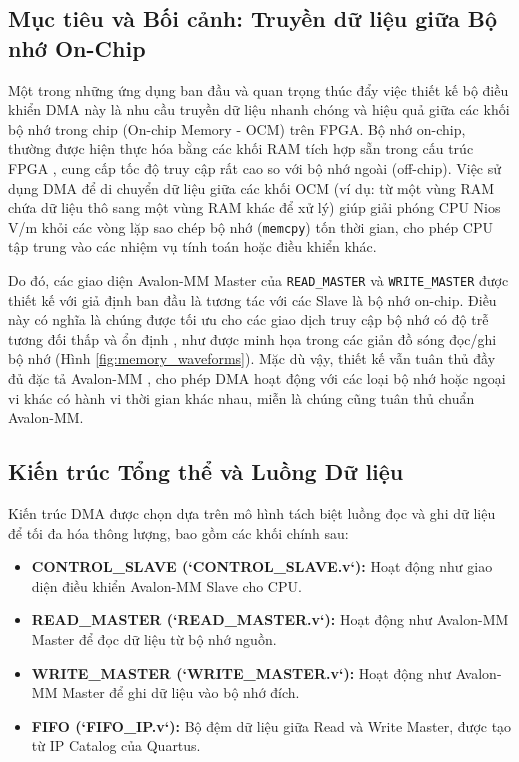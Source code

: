 \subsection{Mục tiêu và Bối cảnh: Truyền dữ liệu giữa Bộ nhớ On-Chip}
\label{subsec:dma_context_onchip}
Một trong những ứng dụng ban đầu và quan trọng thúc đẩy việc thiết kế bộ điều khiển DMA này là nhu cầu truyền dữ liệu nhanh chóng và hiệu quả giữa các khối bộ nhớ trong chip (On-chip Memory - OCM) trên FPGA. Bộ nhớ on-chip, thường được hiện thực hóa bằng các khối RAM tích hợp sẵn trong cấu trúc FPGA \cite{memory_byteenable}, cung cấp tốc độ truy cập rất cao so với bộ nhớ ngoài (off-chip). Việc sử dụng DMA để di chuyển dữ liệu giữa các khối OCM (ví dụ: từ một vùng RAM chứa dữ liệu thô sang một vùng RAM khác để xử lý) giúp giải phóng CPU Nios V/m khỏi các vòng lặp sao chép bộ nhớ (\texttt{memcpy}) tốn thời gian, cho phép CPU tập trung vào các nhiệm vụ tính toán hoặc điều khiển khác.

Do đó, các giao diện Avalon-MM Master của \texttt{READ\_MASTER} và \texttt{WRITE\_MASTER} được thiết kế với giả định ban đầu là tương tác với các Slave là bộ nhớ on-chip. Điều này có nghĩa là chúng được tối ưu cho các giao dịch truy cập bộ nhớ có độ trễ tương đối thấp và ổn định \cite{memory_byteenable}, như được minh họa trong các giản đồ sóng đọc/ghi bộ nhớ (Hình \ref{fig:memory_waveforms}). Mặc dù vậy, thiết kế vẫn tuân thủ đầy đủ đặc tả Avalon-MM \cite{avalon_mm_transfer}, cho phép DMA hoạt động với các loại bộ nhớ hoặc ngoại vi khác có hành vi thời gian khác nhau, miễn là chúng cũng tuân thủ chuẩn Avalon-MM.

\subsection{Kiến trúc Tổng thể và Luồng Dữ liệu}
Kiến trúc DMA được chọn dựa trên mô hình tách biệt luồng đọc và ghi dữ liệu để tối đa hóa thông lượng, bao gồm các khối chính sau:
\begin{itemize}
    \item \textbf{CONTROL\_SLAVE (`CONTROL\_SLAVE.v`):} Hoạt động như giao diện điều khiển Avalon-MM Slave cho CPU.
    \item \textbf{READ\_MASTER (`READ\_MASTER.v`):} Hoạt động như Avalon-MM Master để đọc dữ liệu từ bộ nhớ nguồn.
    \item \textbf{WRITE\_MASTER (`WRITE\_MASTER.v`):} Hoạt động như Avalon-MM Master để ghi dữ liệu vào bộ nhớ đích.
    \item \textbf{FIFO (`FIFO\_IP.v`):} Bộ đệm dữ liệu giữa Read và Write Master, được tạo từ IP Catalog của Quartus.
\end{itemize}

